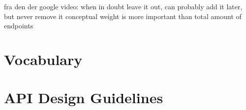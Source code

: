 
fra den der google video:
    when in doubt leave it out, can probably add it later, but never remove it
    conceptual weight is more important than total amount of endpoints

\section{Vocabulary}

\section{API Design Guidelines}
